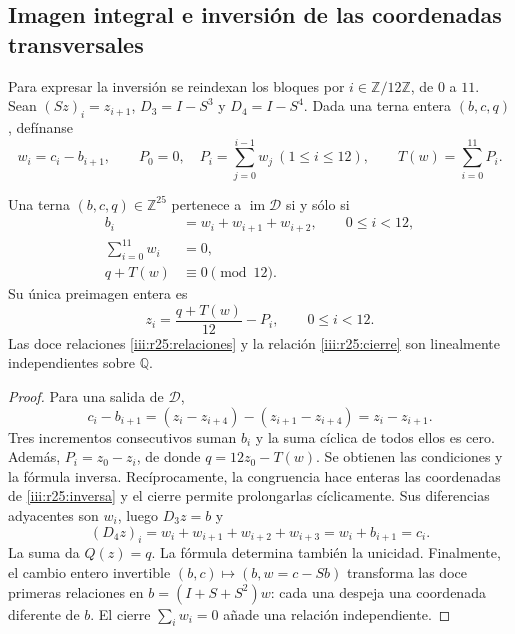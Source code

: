 \subsection{Imagen integral e inversión de las coordenadas transversales}
\label{iii:r25:imagen-seccion}

Para expresar la inversión se reindexan los bloques por
$i\in\mathbb Z/12\mathbb Z$, de $0$ a $11$. Sean
$(Sz)_i=z_{i+1}$, $D_3=I-S^3$ y $D_4=I-S^4$.
Dada una terna entera $(b,c,q)$, defínanse
\begin{equation}
 w_i=c_i-b_{i+1},\qquad
 P_0=0,\quad P_i=\sum_{j=0}^{i-1}w_j\ (1\leq i\leq12),
 \qquad T(w)=\sum_{i=0}^{11}P_i.
 \label{iii:r25:incrementos}
\end{equation}

\begin{theorem}
\label{iii:r25:imagen}
Una terna $(b,c,q)\in\mathbb Z^{25}$ pertenece a
$\operatorname{im}\mathcal D$ si y sólo si
\begin{align}
 b_i&=w_i+w_{i+1}+w_{i+2},\qquad 0\leq i<12,
       \label{iii:r25:relaciones}\\
 \sum_{i=0}^{11}w_i&=0,\label{iii:r25:cierre}\\
 q+T(w)&\equiv0\pmod {12}.\label{iii:r25:congruencia}
\end{align}
Su única preimagen entera es
\begin{equation}
 z_i=\frac{q+T(w)}{12}-P_i,\qquad0\leq i<12.
 \label{iii:r25:inversa}
\end{equation}
Las doce relaciones \eqref{iii:r25:relaciones} y la relación
\eqref{iii:r25:cierre} son linealmente independientes sobre
$\mathbb Q$.
\end{theorem}
\begin{proof}
Para una salida de $\mathcal D$,
\[
 c_i-b_{i+1}
 =(z_i-z_{i+4})-(z_{i+1}-z_{i+4})=z_i-z_{i+1}.
\]
Tres incrementos consecutivos suman $b_i$ y la suma cíclica de
todos ellos es cero. Además, $P_i=z_0-z_i$, de donde
$q=12z_0-T(w)$. Se obtienen las condiciones y la fórmula inversa.
Recíprocamente, la congruencia hace enteras las coordenadas de
\eqref{iii:r25:inversa} y el cierre permite prolongarlas
cíclicamente. Sus diferencias adyacentes son $w_i$, luego $D_3z=b$
y
\[
 (D_4z)_i=w_i+w_{i+1}+w_{i+2}+w_{i+3}
 =w_i+b_{i+1}=c_i.
\]
La suma da $Q(z)=q$. La fórmula determina también la unicidad.
Finalmente, el cambio entero invertible
$(b,c)\mapsto(b,w=c-Sb)$ transforma las doce primeras relaciones
en $b=(I+S+S^2)w$: cada una despeja una coordenada diferente de
$b$. El cierre $\sum_iw_i=0$ añade una relación independiente.
\end{proof}

